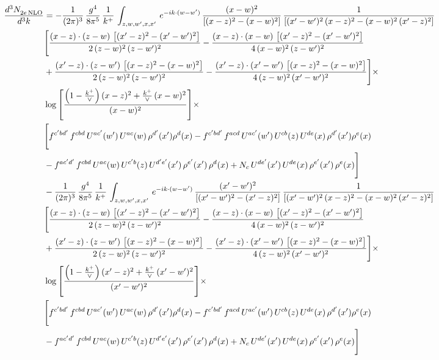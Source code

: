 \documentclass[9pt]{article}
\numberwithin{equation}{section}
\begin{document}
\begin{align}
 \frac{d^{3}N_{2e\,\rm NLO}^{\rm}}{d^{3}k}  & =   -\frac{1}{(2\pi)^{3}}\, \frac{g^{4}}{8\pi^{5}}\,\frac{1}{k^{+}}\,\int_{z,w,w^{\prime},x,x'}\, e^{-ik\cdot (w-w')}\,\frac{(x-w)^{2}}{\left[(x-z)^{2}-(x-w)^{2}\right]}\, \frac{1}{\left[(x'-w')^{2}\, (x-z)^{2} - (x-w)^{2}\, (x'-z)^{2}\right]} \notag \\ & \Bigg[\frac{(x-z)\cdot (z-w)\, \left[(x'-z)^{2}-(x'-w')^{2}\right]}{2\, (z-w)^{2}\, (z-w')^{2}}  - \frac{(x-z)\cdot (x-w)\,\left[(x'-z)^{2}-(x'-w')^{2}\right] }{4\,(x-w)^{2}\,(z-w')^{2}}\notag \\ & +\frac{(x'-z)\cdot (z-w')\, \left[(x-z)^{2}-(x-w)^{2}\right]}{2\, (z-w)^{2}\, (z-w')^{2}}-\frac{(x'-z)\cdot (x'-w')\, \left[(x-z)^{2}-(x-w)^{2}\right]}{4\, (z-w)^{2}\,(x'-w')^{2}}\Bigg]\times\,\notag \\ & \log{\left[\frac{\left(1-\frac{k^{+}}{\vee}\right)(x-z)^{2}+\frac{k^{+}}{\vee}\,(x-w)^{2}}{(x-w)^{2}}\right]}\times\,\notag \\ & \Bigg[f^{c'bd'}\,f^{cbd}\, U^{ac'}(w')\,U^{ac}(w)\,\rho^{d'}(x')\rho^{d}(x)- f^{c'bd'}\,f^{acd}\,U^{ac'}(w')\,U^{cb}(z)\,U^{de}(x)\,\rho^{d'}(x')\rho^{e}(x) \notag \\ & -f^{ac'd'}\,f^{cbd}\,U^{ac}(w)\,U^{c'b}(z)\,U^{d'e'}(x')\,\rho^{e'}(x')\,\rho^{d}(x) +N_{c}\,U^{de'}(x')\,U^{de}(x)\,\rho^{e'}(x')\,\rho^{e}(x)\Bigg] \notag \\
& -\frac{1}{(2\pi)^{3}}\, \frac{g^{4}}{8\pi^{5}}\,\frac{1}{k^{+}}\,\int_{z,w,w^{\prime},x,x'}\, e^{-ik\cdot (w-w')}\, \frac{(x'-w')^{2}}{\left[(x'-w')^{2}-(x'-z)^{2}\right]}\, \frac{1}{\left[(x'-w')^{2}\, (x-z)^{2} - (x-w)^{2}\, (x'-z)^{2}\right]}  \notag \\ & \Bigg[\frac{(x-z)\cdot (z-w)\, \left[(x'-z)^{2}-(x'-w')^{2}\right]}{2\, (z-w)^{2}\, (z-w')^{2}}  - \frac{(x-z)\cdot (x-w)\,\left[(x'-z)^{2}-(x'-w')^{2}\right] }{4\,(x-w)^{2}\,(z-w')^{2}}\notag \\ & +\frac{(x'-z)\cdot (z-w')\, \left[(x-z)^{2}-(x-w)^{2}\right]}{2\, (z-w)^{2}\, (z-w')^{2}}-\frac{(x'-z)\cdot (x'-w')\, \left[(x-z)^{2}-(x-w)^{2}\right]}{4\, (z-w)^{2}\,(x'-w')^{2}}\Bigg]\times\,\notag \\ & \log{\left[\frac{\left(1-\frac{k^{+}}{\vee}\right)(x'-z)^{2}+\frac{k^{+}}{\vee}\,(x'-w')^{2}}{(x'-w')^{2}}\right]}\times\notag \\ & \Bigg[f^{c'bd'}\,f^{cbd}\, U^{ac'}(w')\,U^{ac}(w)\,\rho^{d'}(x')\rho^{d}(x)- f^{c'bd'}\,f^{acd}\,U^{ac'}(w')\,U^{cb}(z)\,U^{de}(x)\,\rho^{d'}(x')\rho^{e}(x) \notag \\ & -f^{ac'd'}\,f^{cbd}\,U^{ac}(w)\,U^{c'b}(z)\,U^{d'e'}(x')\,\rho^{e'}(x')\,\rho^{d}(x) +N_{c}\,U^{de'}(x')\,U^{de}(x)\,\rho^{e'}(x')\,\rho^{e}(x)\Bigg]
\end{align}
\end{document}
